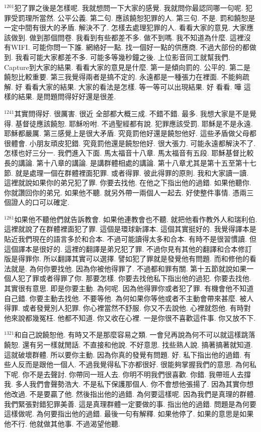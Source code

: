 \documentclass{book}
\begin{document}
$^{1201}$犯了罪之後是怎樣呢.
我就想問一下大家的感覺.
我就問你最認同哪一句呢.
犯罪受罰理所當然.
公平公義.
第二句.
應該饒恕犯罪的人.
第三句.
不是.
罰和饒恕是一定中間有很大的矛盾.
解決不了.
怎樣去處理犯罪的人.
看看大家的意見.
大家應該做到.
做到那個問卷.
我看到有些都差不多.
做不到嗎.
我不知道為什麼.
這裡沒有WIFI.
可能你問一下誰.
網絡好一點.
找一個好一點的供應商.
不過大部份的都做到.
我看可能大家都差不多.
可能多等幾秒鐘之後.
上位影音同工就幫我們.
Capture到大家的結果.
看看大家的意見是什麼.
第一是傾向罰的.
公平的.
第二是饒恕比較重要.
第三我覺得兩者是搞不定的.
永遠都是一種張力在裡面.
不能夠疏解.
好 看看大家的結果.
大家的看法是怎樣.
等一等可以出現結果.
好 看看.
嘩 這樣的結果.
是問題問得好好還是很差.

$^{1241}$其實問得好.
很厲害.
很近 全部都大概三成.
不錯不錯.
最多.
我想大家是不是覺得.
基督徒應該饒恕.
耶穌吩咐.
不過聖經都有說.
犯罪應該受罰.
耶穌是不是永遠.
耶穌都嚴厲.
第三感覺上是很大矛盾.
究竟罰他好還是饒恕他好.
這些矛盾做父母都很體會.
小朋友頑皮犯錯.
究竟罰他還是饒恕他好.
很大張力.
可能永遠都解決不了.
怎樣也好三分一.
我們進入下面.
馬太福音十八章.
馬太福音有五段.
耶穌基督比較長的講論.
第十八章的講論.
是講群體相處的講論.
第十八章尤其是第十五至第十七節.
就是處理一個在群體裡面犯罪.
或者得罪.
彼此得罪的原則.
我和大家讀一讀.
這裡就說如果你的弟兄犯了罪.
你要去找他.
在他之下指出他的過錯.
如果他聽你.
你就讚回你的弟兄.
如果他不聽.
就另外帶一兩個人一起去.
好使整件事情.
憑兩三個證人的口可以確定.

$^{1281}$如果他不聽他們就告訴教會.
如果他連教會也不聽.
就把他看作教外人和瑞利伯.
這裡就說了在群體裡面犯了罪.
這個是環球新譯本.
這個其實挺好的.
我覺得譯本是貼近我們現在的語言多於和合本.
不過可能讀得太多和合本.
有時不是很習慣讀.
但這個譯本是很好的.
這裡的翻譯是弟兄犯了罪.
不過你見有其他的翻譯和合本修訂版是得罪你.
所以翻譯其實可以選擇.
譬如犯了罪就是發覺他有問題.
而和修他的看法就是.
為何你要找他.
因為你被他得罪了.
不過都和罪有關.
第十五節就說如果一個人犯了罪或者得罪了你.
那要怎樣.
你要去找他私下指出他的過犯.
你要去找他.
其實很有意思.
即是你要主動.
為何呢.
因為他得罪你或者犯了罪.
有機會他不知道自己錯.
你要主動去找他.
不要等他.
為何如果你等他或者不主動會帶來甚麼.
被人得罪.
或者發覺別人犯罪.
你心裡當然不舒服.
你又不去說他.
心裡就怨他.
有時對他來說都幾冤枉.
他都不知道.
你又收在心裡.
一是你很不喜歡這件事.
你又放不下.

$^{1321}$和自己說饒恕他.
有時又不是那麼容易之類.
一會兒再說為何不可以就這樣跳落饒恕.
還有另一樣就閒話.
不直接和他說.
不好意思.
找些熟人說.
搞著搞著就知道.
這就破壞群體.
所以要你主動.
因為你真的發覺有問題.
好.
私下指出他的過錯.
有些人反而是跟他一個人.
不過我覺得私下亦都很好.
很能夠掌握我們的意思.
為何私下呢.
你不是去聲討.
你帶同一班人去.
你明不明我們很喜歡.
你錯.
我帶班人去撐我.
多人我們會聲勢浩大.
不是私下保護那個人.
你不會想他張揚了.
因為其實你想他改過.
不是要贏了他.
然後指出他的過錯.
為何要這樣呢.
因為我們是真理的群體.
我們緊張對錯犯罪美善.
這是真理群體一定要做的事.
指出他的過錯.
問題是為何要這樣做呢.
為何要指出他的過錯.
最後一句有解釋.
如果他停了.
如果的意思是如果他不行.
他就做其他事.
不過渴望他聽.
\end{document}
